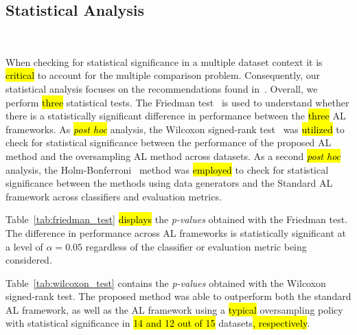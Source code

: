 \documentclass[preprint, 12pt]{elsarticle}
\begin{document}
\subsection{Statistical Analysis}~\label{sec:statistical-analysis}

When checking for statistical significance in a multiple dataset context it is
\hl{critical} to account for the multiple comparison problem. Consequently, our
statistical analysis focuses on the recommendations found
in~\cite{Demsar2006}. Overall, we perform \hl{three} statistical tests. The Friedman
test~\cite{Friedman1937} is used to understand whether there is a
statistically significant difference in performance between the \hl{three} AL
frameworks. As \hl{\textit{post hoc}} analysis, the Wilcoxon signed-rank
test~\cite{Wilcoxon1945} was \hl{utilized} to check for statistical significance
between the performance of the proposed AL method and the oversampling AL
method across datasets. As a second \hl{\textit{post hoc}} analysis, the
Holm-Bonferroni~\cite{Holm1979} method was \hl{employed} to check for statistical
significance between the methods using data generators and the Standard AL
framework across classifiers and evaluation metrics.
 
Table~\ref{tab:friedman_test} \hl{displays} the \textit{p-values} obtained with the
Friedman test. The difference in performance across AL frameworks is
statistically significant at a level of $\alpha = 0.05$ regardless of the
classifier or evaluation metric being considered.

\begin{table}[H]
	\centering
    \caption{%
        Friedman test \hl{results}. Statistical significance is tested at a
        level of $\alpha = 0.05$. The null hypothesis is that there is no
        difference in the classification outcome across oversamplers.
    }\label{tab:friedman_test}
\end{table}

Table~\ref{tab:wilcoxon_test} contains the \textit{p-values} obtained with the
Wilcoxon signed-rank test. The proposed method was able to outperform both the
standard AL framework, as well as the AL framework using a \hl{typical}
oversampling policy with statistical significance in \hl{14 and 12 out of 15}
datasets\hl{, respectively}.
\end{document}
